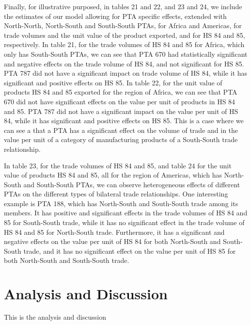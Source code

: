 \documentclass[12pt]{article}%
\begin{document}
Finally, for illustrative purposed, in tables 21 and 22, and 23 and 24,
we include the estimates of our model allowing for PTA specific effects,
extended with North-North, North-South and South-South PTAs, for Africa
and Americas, for trade volumes and the unit value of the product
exported, and for HS 84 and 85, respectively. In table 21, for the trade
volumes of HS 84 and 85 for Africa, which only has South-South PTAs, we
can see that PTA 670 had statistically significant and negative effects
on the trade volume of HS 84, and not significant for HS 85. PTA 787 did
not have a significant impact on trade volume of HS 84, while it has
significant and positive effects on HS 85. In table 22, for the unit
value of products HS 84 and 85 exported for the region of Africa, we can
see that PTA 670 did not have significant effects on the value per unit
of products in HS 84 and 85. PTA 787 did not have a significant impact
on the value per unit of HS 84, while it has significant and positive
effects on HS 85. This is a case where we can see a that a PTA has a
significant effect on the volume of trade and in the value per unit of a
category of manufacturing products of a South-South trade relationship.

In table 23, for the trade volumes of HS 84 and 85, and table 24 for the
unit value of products HS 84 and 85, all for the region of Americas,
which has North-South and South-South PTAs, we can observe heterogeneous
effects of different PTAs on the different types of bilateral trade
relationships. One interesting example is PTA 188, which has North-South
and South-South trade among its members. It has positive and significant
effects in the trade volumes of HS 84 and 85 for South-South trade,
while it has no significant effect in the trade volume of HS 84 and 85
for North-South trade. Furthermore, it has a significant and negative
effects on the value per unit of HS 84 for both North-South and
South-South trade, and it has no significant effect on the value per
unit of HS 85 for both North-South and South-South trade.
%
%
%
%
%
%
%
%
%
%
%
%
%
\FloatBarrier

%
\section{Analysis and Discussion}%
\label{sec:AnalysisandDiscussion}%
This is the analysis and discussion
\end{document}
